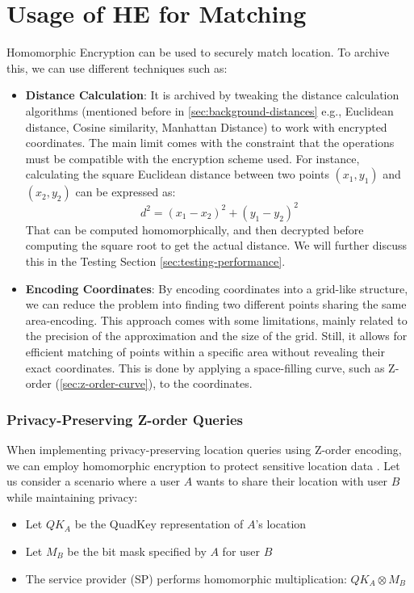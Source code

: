 \section{Usage of HE for Matching}
Homomorphic Encryption can be used to securely match location. To archive this, we can use different techniques such as:
\begin{itemize}
    \item \textbf{Distance Calculation}: It is archived by tweaking the distance calculation algorithms (mentioned before in \cref{sec:background-distances} e.g., Euclidean distance, Cosine similarity, Manhattan Distance) to work with encrypted coordinates. The main limit comes with the constraint that the operations must be compatible with the encryption scheme used. For instance, calculating the square Euclidean distance between two points \( (x_1, y_1) \) and \( (x_2, y_2) \) can be expressed as:
    \[
        d^2 = (x_1 - x_2)^2 + (y_1 - y_2)^2
    \]
    That can be computed homomorphically, and then decrypted before computing the square root to get the actual distance. We will further discuss this in the Testing Section \ref{sec:testing-performance}.
    \item \textbf{Encoding Coordinates}: By encoding coordinates into a grid-like structure, we can reduce the problem into finding two different points sharing the same area-encoding. This approach comes with some limitations, mainly related to the precision of the approximation and the size of the grid. Still, it allows for efficient matching of points within a specific area without revealing their exact coordinates. This is done by applying a space-filling curve, such as Z-order (\cref{sec:z-order-curve}), to the coordinates.
\end{itemize}

\subsubsection{Privacy-Preserving Z-order Queries} \label{sec:privacy-preserving-z-order}

When implementing privacy-preserving location queries using Z-order encoding, we can employ homomorphic encryption to protect sensitive location data \cite{zhang2020privacy}. Let us consider a scenario where a user \( A \) wants to share their location with user \( B \) while maintaining privacy:

\begin{itemize}
    \item Let \( QK_A \) be the QuadKey representation of \( A \)'s location
    \item Let \( M_B \) be the bit mask specified by \( A \) for user \( B \)
    \item The service provider (SP) performs homomorphic multiplication: \( QK_A \otimes M_B \)
\end{itemize}


